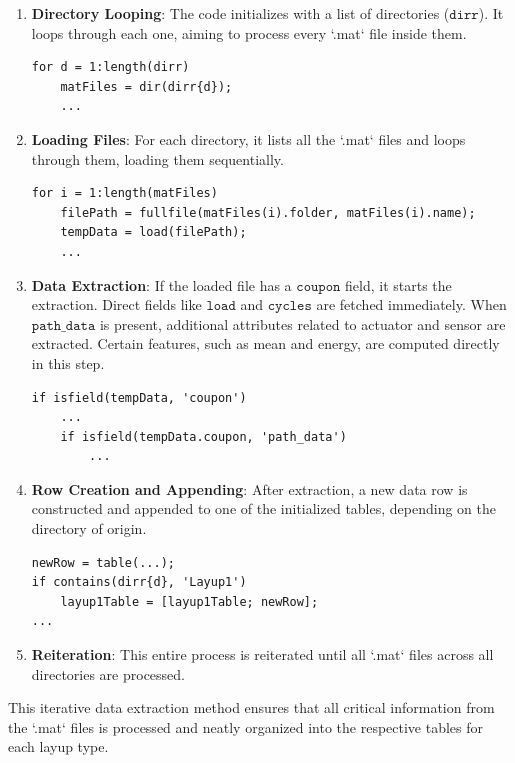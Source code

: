 \begin{enumerate}
    \item \textbf{Directory Looping}: The code initializes with a list of directories ($\texttt{dirr}$). It loops through each one, aiming to process every `.mat` file inside them.
    
    \begin{lstlisting}
for d = 1:length(dirr)
    matFiles = dir(dirr{d});
    ...
\end{lstlisting}
    
    \item \textbf{Loading Files}: For each directory, it lists all the `.mat` files and loops through them, loading them sequentially.
    
    \begin{lstlisting}
for i = 1:length(matFiles)
    filePath = fullfile(matFiles(i).folder, matFiles(i).name);
    tempData = load(filePath);
    ...
\end{lstlisting}

    \item \textbf{Data Extraction}: If the loaded file has a $\texttt{coupon}$ field, it starts the extraction. Direct fields like $\texttt{load}$ and $\texttt{cycles}$ are fetched immediately. When $\texttt{path\_data}$ is present, additional attributes related to actuator and sensor are extracted. Certain features, such as mean and energy, are computed directly in this step.
    
    \begin{lstlisting}
if isfield(tempData, 'coupon')
    ...
    if isfield(tempData.coupon, 'path_data')
        ...
\end{lstlisting}

    \item \textbf{Row Creation and Appending}: After extraction, a new data row is constructed and appended to one of the initialized tables, depending on the directory of origin.
    
    \begin{lstlisting}
newRow = table(...);
if contains(dirr{d}, 'Layup1')
    layup1Table = [layup1Table; newRow];
...
\end{lstlisting}

    \item \textbf{Reiteration}: This entire process is reiterated until all `.mat` files across all directories are processed.
\end{enumerate}

This iterative data extraction method ensures that all critical information from the `.mat` files is processed and neatly organized into the respective tables for each layup type.

